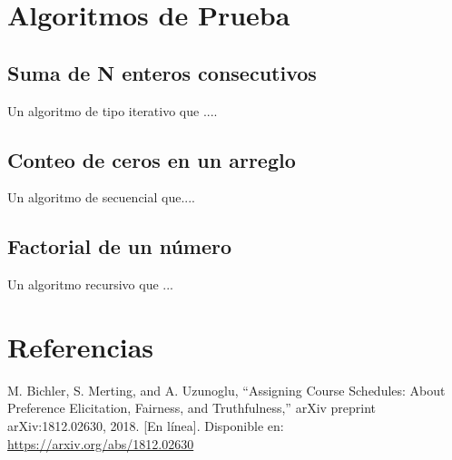 \documentclass{article}
\begin{document}
\section{Algoritmos de Prueba}

\subsection{Suma de N enteros consecutivos}

Un algoritmo de tipo iterativo que ....

\subsection{Conteo de ceros en un arreglo}

Un algoritmo de secuencial que....

\subsection{Factorial de un número}

Un algoritmo recursivo que ...



\section{Referencias}
\renewcommand{\refname}{}

\begin{thebibliography}{9}

 \label{ref:BPS} M. Bichler, S. Merting, and A. Uzunoglu, 
“Assigning Course Schedules: About Preference Elicitation, Fairness, and Truthfulness,” 
arXiv preprint arXiv:1812.02630, 2018. [En línea]. Disponible en: 
\url{https://arxiv.org/abs/1812.02630}


\end{thebibliography}
\end{document}
